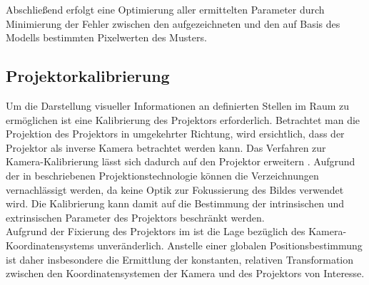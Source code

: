 Abschließend erfolgt eine Optimierung aller ermittelten Parameter durch Minimierung der Fehler zwischen den aufgezeichneten und den auf Basis des Modells bestimmten Pixelwerten des Musters.\\




\subsection{Projektorkalibrierung}
Um die Darstellung visueller Informationen an definierten Stellen im Raum zu ermöglichen ist eine Kalibrierung des Projektors erforderlich. Betrachtet man die Projektion des Projektors in umgekehrter Richtung, wird ersichtlich, dass der Projektor als inverse Kamera betrachtet werden kann. Das Verfahren zur Kamera-Kalibrierung lässt sich dadurch auf den Projektor erweitern \cite{Falcao2008}. Aufgrund der in  beschriebenen Projektionstechnologie können die Verzeichnungen vernachlässigt werden, da keine Optik zur Fokussierung des Bildes verwendet wird. Die Kalibrierung kann damit auf die Bestimmung der intrinsischen und extrinsischen Parameter des Projektors beschränkt werden.\\

Aufgrund der Fixierung des Projektors im \kps{} ist die Lage bezüglich des Kamera-Koordinatensystems unveränderlich. Anstelle einer globalen Positionsbestimmung ist daher insbesondere die Ermittlung der konstanten, relativen Transformation zwischen den Koordinatensystemen der Kamera und des Projektors von Interesse.\\

